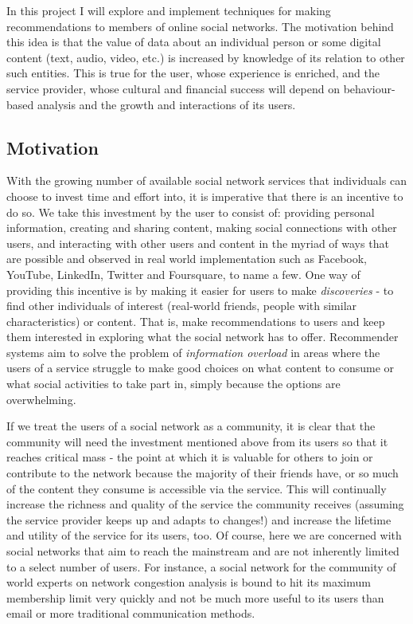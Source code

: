 In this project I will explore and implement techniques for making recommendations to members of online social networks. The motivation behind this idea is that the value of data about an individual person or some digital content (text, audio, video, etc.) is increased by knowledge of its relation to other such entities. This is true for the user, whose experience is enriched, and the service provider, whose cultural and financial success will depend on behaviour-based analysis and the growth and interactions of its users.

\subsection*{Motivation}

With the growing number of available social network services that individuals can choose to invest time and effort into, it is imperative that there is an incentive to do so. We take this investment by the user to consist of: providing personal information, creating and sharing content, making social connections with other users, and interacting with other users and content in the myriad of ways that are possible and observed in real world implementation such as Facebook, YouTube, LinkedIn, Twitter and Foursquare, to name a few. One way of providing this incentive is by making it easier for users to make \emph{discoveries} - to find other individuals of interest (real-world friends, people with similar characteristics) or content. That is, make recommendations to users and keep them interested in exploring what the social network has to offer. Recommender systems aim to solve the problem of \emph{information overload} in areas where the users of a service struggle to make good choices on what content to consume or what social activities to take part in, simply because the options are overwhelming.

If we treat the users of a social network as a community, it is clear that the community will need the investment mentioned above from its users so that it reaches critical mass - the point at which it is valuable for others to join or contribute to the network because the majority of their friends have, or so much of the content they consume is accessible via the service. This will continually increase the richness and quality of the service the community receives (assuming the service provider keeps up and adapts to changes!) and increase the lifetime and utility of the service for its users, too. Of course, here we are concerned with social networks that aim to reach the mainstream and are not inherently limited to a select number of users. For instance, a social network for the community of world experts on network congestion analysis is bound to hit its maximum membership limit very quickly and not be much more useful to its users than email or more traditional communication methods.

